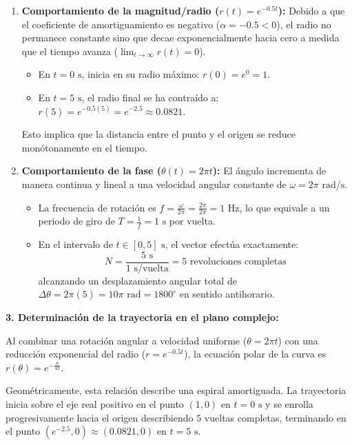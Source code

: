 \documentclass[11pt,a4paper]{article}
\begin{document}
\begin{enumerate}
    \item \textbf{Comportamiento de la magnitud/radio ($r(t) = e^{-0.5t}$):}
    Debido a que el coeficiente de amortiguamiento es negativo ($\alpha = -0.5 < 0$), el radio no permanece constante sino que decae exponencialmente hacia cero a medida que el tiempo avanza ($\lim_{t \to \infty} r(t) = 0$).
    \begin{itemize}
        \item En $t = 0\text{ s}$, inicia en su radio máximo: $r(0) = e^0 = 1$.
        \item En $t = 5\text{ s}$, el radio final se ha contraído a: $r(5) = e^{-0.5(5)} = e^{-2.5} \approx 0.0821$.
    \end{itemize}
    Esto implica que la distancia entre el punto y el origen se reduce monótonamente en el tiempo.

    \item \textbf{Comportamiento de la fase ($\theta(t) = 2\pi t$):}
    El ángulo incrementa de manera continua y lineal a una velocidad angular constante de $\omega = 2\pi\text{ rad/s}$.
    \begin{itemize}
        \item La frecuencia de rotación es $f = \frac{\omega}{2\pi} = \frac{2\pi}{2\pi} = 1\text{ Hz}$, lo que equivale a un periodo de giro de $T = \frac{1}{f} = 1\text{ s}$ por vuelta.
        \item En el intervalo de $t \in [0, 5]\text{ s}$, el vector efectúa exactamente:
        \[
        N = \frac{5\text{ s}}{1\text{ s/vuelta}} = 5 \text{ revoluciones completas}
        \]
        alcanzando un desplazamiento angular total de $\Delta\theta = 2\pi(5) = 10\pi\text{ rad} = 1800^\circ$ en sentido antihorario.
    \end{itemize}
\end{enumerate}

\noindent\textbf{3. Determinación de la trayectoria en el plano complejo:}

Al combinar una rotación angular a velocidad uniforme ($\theta = 2\pi t$) con una reducción exponencial del radio ($r = e^{-0.5t}$), la ecuación polar de la curva es $r(\theta) = e^{-\frac{\theta}{4\pi}}$.

Geométricamente, esta relación describe una espiral amortiguada. La trayectoria inicia sobre el eje real positivo en el punto $(1, 0)$ en $t = 0\text{ s}$ y se enrolla progresivamente hacia el origen describiendo $5$ vueltas completas, terminando en el punto $(e^{-2.5}, 0) \approx (0.0821, 0)$ en $t = 5\text{ s}$.
\end{document}
